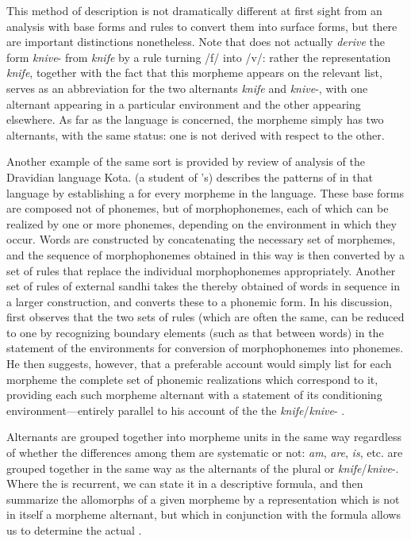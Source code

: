 This method of description is not dramatically different at first
sight from an analysis with base forms and rules to convert them into
surface forms, but there are important distinctions nonetheless. Note
that {\Harris} does not actually \emph{derive} the form \emph{knive}-
from \emph{knife} by a rule turning /f/ into /v/: rather the
representation \emph{knife}, together with the fact that this morpheme
appears on the relevant list, serves as an abbreviation for the two
alternants \emph{knife} and \emph{knive}-, with one alternant
appearing in a particular environment and the other appearing
elsewhere. As far as the language is concerned, the morpheme simply
has two alternants, with the same status: one is not derived with
respect to the other.

Another example of the same sort is provided by
 review of 
analysis of the Dravidian language Kota. {\Emeneau} (a student of
{\Sapir}'s) describes the patterns of  in that language by
establishing a  for every morpheme in the language. These
base forms are composed not of phonemes, but of morphophonemes, each
of which can be realized by one or more phonemes, depending on the
environment in which they occur. Words are constructed by
concatenating the necessary set of morphemes, and the sequence of
morphophonemes obtained in this way is then converted by a set of rules
that replace the individual morphophonemes appropriately. Another set
of rules of external sandhi takes the  thereby obtained
of words in sequence in a larger construction, and converts these to a
phonemic form. In his discussion, {\Harris} first observes that the two
sets of rules (which are often the same, can be reduced to one by
recognizing boundary elements (such as that between words) in the
statement of the environments for conversion of morphophonemes into
phonemes. He then suggests, however, that a preferable account would
simply list for each morpheme the complete set of phonemic
realizations which correspond to it, providing each such morpheme
alternant with a statement of its conditioning environment---entirely
parallel to his account of the the \emph{knife}/\emph{knive}-
.

Alternants are grouped together into morpheme units in the same way
regardless of whether the differences among them are systematic or
not: \emph{am}, \emph{are}, \emph{is}, etc. are grouped together in
the same way as the alternants of the  plural or
\emph{knife}/\emph{knive}-. Where the  is recurrent, we can
state it in a descriptive formula, and then summarize the allomorphs
of a given morpheme by a representation which is not in itself a
morpheme alternant, but which in conjunction with the formula allows
us to determine the actual .

